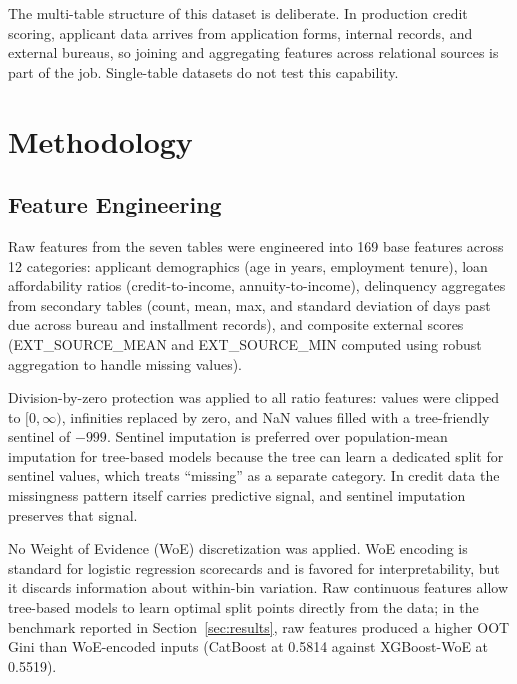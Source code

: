 \documentclass[11pt, a4paper]{article}
\begin{document}
The multi-table structure of this dataset is deliberate. In production credit scoring, applicant data arrives from application forms, internal records, and external bureaus, so joining and aggregating features across relational sources is part of the job. Single-table datasets do not test this capability.

\section{Methodology}
\label{sec:methodology}

\subsection{Feature Engineering}

Raw features from the seven tables were engineered into 169 base features across 12 categories: applicant demographics (age in years, employment tenure), loan affordability ratios (credit-to-income, annuity-to-income), delinquency aggregates from secondary tables (count, mean, max, and standard deviation of days past due across bureau and installment records), and composite external scores (EXT\_SOURCE\_MEAN and EXT\_SOURCE\_MIN computed using robust aggregation to handle missing values).

Division-by-zero protection was applied to all ratio features: values were clipped to $[0, \infty)$, infinities replaced by zero, and NaN values filled with a tree-friendly sentinel of $-999$. Sentinel imputation is preferred over population-mean imputation for tree-based models because the tree can learn a dedicated split for sentinel values, which treats ``missing'' as a separate category. In credit data the missingness pattern itself carries predictive signal, and sentinel imputation preserves that signal.

No Weight of Evidence (WoE) discretization was applied. WoE encoding is standard for logistic regression scorecards and is favored for interpretability, but it discards information about within-bin variation. Raw continuous features allow tree-based models to learn optimal split points directly from the data; in the benchmark reported in Section~\ref{sec:results}, raw features produced a higher OOT Gini than WoE-encoded inputs (CatBoost at 0.5814 against XGBoost-WoE at 0.5519).
\end{document}
